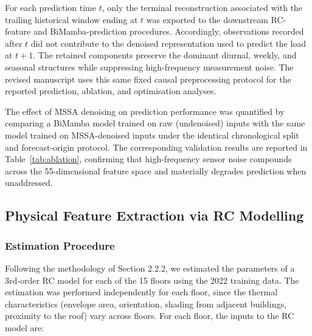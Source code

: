 \documentclass[11pt]{article}
\begin{document}
For each prediction time $t$, only the terminal reconstruction associated with the trailing historical window ending at $t$ was exported to the downstream RC-feature and BiMamba-prediction procedures. Accordingly, observations recorded after $t$ did not contribute to the denoised representation used to predict the load at $t+1$. The retained components preserve the dominant diurnal, weekly, and seasonal structures while suppressing high-frequency measurement noise. The revised manuscript uses this same fixed causal preprocessing protocol for the reported prediction, ablation, and optimisation analyses.

The effect of MSSA denoising on prediction performance was quantified by comparing a BiMamba model trained on raw (undenoised) inputs with the same model trained on MSSA-denoised inputs under the identical chronological split and forecast-origin protocol. The corresponding validation results are reported in Table~\ref{tab:ablation}, confirming that high-frequency sensor noise compounds across the 55-dimensional feature space and materially degrades prediction when unaddressed.

\subsection{Physical Feature Extraction via RC Modelling}

\subsubsection{Estimation Procedure}

Following the methodology of Section 2.2.2, we estimated the parameters of a 3rd-order RC model for each of the 15 floors using the 2022 training data. The estimation was performed independently for each floor, since the thermal characteristics (envelope area, orientation, shading from adjacent buildings, proximity to the roof) vary across floors. For each floor, the inputs to the RC model are:
\end{document}

